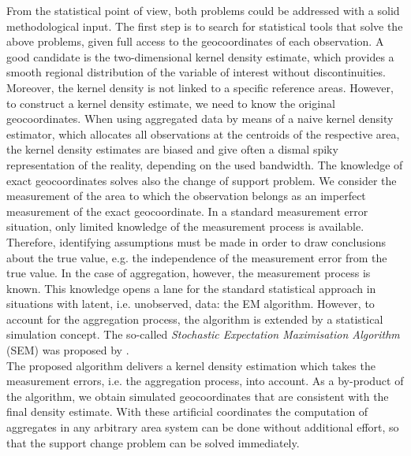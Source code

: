 From the statistical point of view, both problems could be addressed with a solid methodological input.
The first step is to search for statistical tools that solve the above problems, given full access to the geocoordinates of each observation.
A good candidate is the two-dimensional kernel density estimate, which provides a smooth regional distribution of the variable of interest without discontinuities. 
Moreover, the kernel density is not linked to a specific reference areas. 
However, to construct a kernel density estimate, we need to know the original geocoordinates.
When using aggregated data by means of a naive kernel density estimator, which allocates all observations at the centroids of the respective area, the kernel density estimates are biased and give often a dismal spiky representation of the reality, depending on the used bandwidth.
The knowledge of exact geocoordinates solves also the change of support problem. 
We consider the measurement of the area to which the observation belongs as an imperfect measurement of the exact geocoordinate.  
In a standard measurement error situation, only limited knowledge of the measurement process is available. Therefore, identifying assumptions must be made in order to draw conclusions about the true value, e.g. the independence of the measurement error from the true value.
In the case of aggregation, however, the measurement process is known. 
This knowledge opens a lane for the standard statistical approach in situations with latent, i.e. unobserved, data: the EM algorithm. However, to account for the aggregation process, the algorithm is extended by a statistical simulation concept. The so-called \textit{Stochastic Expectation Maximisation Algorithm} (SEM) was proposed by \cite{Celeux1996}. \\

The proposed algorithm delivers a kernel density estimation which takes the measurement errors, i.e. the aggregation process, into account. 
As a by-product of the algorithm, we obtain simulated geocoordinates that are consistent with the final density estimate. 
With these artificial coordinates the computation of aggregates in any arbitrary area system can be done without additional effort, so that the support change problem can be solved immediately. \\

